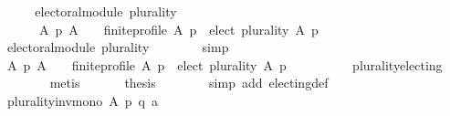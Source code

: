 \begin{isabellebody}
%
\isadelimproof
%
\endisadelimproof
%
\isatagproof
{}\isamarkupfalse%
\ {\isacharminus}{\kern0pt}\isanewline
\ \ \isamarkupfalse%
\ {\isachardoublequoteopen}electoral{\isacharunderscore}{\kern0pt}module\ plurality\ {\isasymand}\isanewline
\ \ \ \ \ \ {\isacharparenleft}{\kern0pt}{\isasymforall}A\ p{\isachardot}{\kern0pt}\ {\isacharparenleft}{\kern0pt}A\ {\isasymnoteq}\ {\isacharbraceleft}{\kern0pt}{\isacharbraceright}{\kern0pt}\ {\isasymand}\ finite{\isacharunderscore}{\kern0pt}profile\ A\ p{\isacharparenright}{\kern0pt}\ {\isasymlongrightarrow}\ elect\ plurality\ A\ p\ {\isasymnoteq}\ {\isacharbraceleft}{\kern0pt}{\isacharbraceright}{\kern0pt}{\isacharparenright}{\kern0pt}{\isachardoublequoteclose}\isanewline
\ \ \isamarkupfalse%
\isanewline
\ \ \ \ \isamarkupfalse%
\ {\isachardoublequoteopen}electoral{\isacharunderscore}{\kern0pt}module\ plurality{\isachardoublequoteclose}\isanewline
\ \ \ \ \ \ \isamarkupfalse%
\ simp\isanewline
\ \ \isamarkupfalse%
\isanewline
\ \ \ \ \isamarkupfalse%
\ {\isachardoublequoteopen}{\isacharparenleft}{\kern0pt}{\isasymforall}A\ p{\isachardot}{\kern0pt}\ {\isacharparenleft}{\kern0pt}A\ {\isasymnoteq}\ {\isacharbraceleft}{\kern0pt}{\isacharbraceright}{\kern0pt}\ {\isasymand}\ finite{\isacharunderscore}{\kern0pt}profile\ A\ p{\isacharparenright}{\kern0pt}\ {\isasymlongrightarrow}\ elect\ plurality\ A\ p\ {\isasymnoteq}\ {\isacharbraceleft}{\kern0pt}{\isacharbraceright}{\kern0pt}{\isacharparenright}{\kern0pt}{\isachardoublequoteclose}\isanewline
\ \ \ \ \ \ \isamarkupfalse%
\ plurality{\isacharunderscore}{\kern0pt}electing{}\isanewline
\ \ \ \ \ \ \isamarkupfalse%
\ metis\isanewline
\ \ \isamarkupfalse%
\isanewline
\ \ \isamarkupfalse%
\ {\isacharquery}{\kern0pt}thesis\isanewline
\ \ \ \ \ \ \isamarkupfalse%
\ {\isacharparenleft}{\kern0pt}simp\ add{\isacharcolon}{\kern0pt}\ electing{\isacharunderscore}{\kern0pt}def{\isacharparenright}{\kern0pt}\isanewline
{}\isamarkupfalse%
%
\endisatagproof
{\isafoldproof}%
%
\isadelimproof
%
\endisadelimproof
%
\isadelimdocument
%
\endisadelimdocument
%
\isatagdocument
%
\isamarkuptrue%
%
\endisatagdocument
{\isafolddocument}%
%
\isadelimdocument
%
\endisadelimdocument
{}\isamarkupfalse%
\ plurality{\isacharunderscore}{\kern0pt}inv{\isacharunderscore}{\kern0pt}mono{}{\isacharcolon}{\kern0pt}\ {\isachardoublequoteopen}{\isasymforall}A\ p\ q\ a{\isachardot}{\kern0pt}\isanewline

\end{isabellebody}
